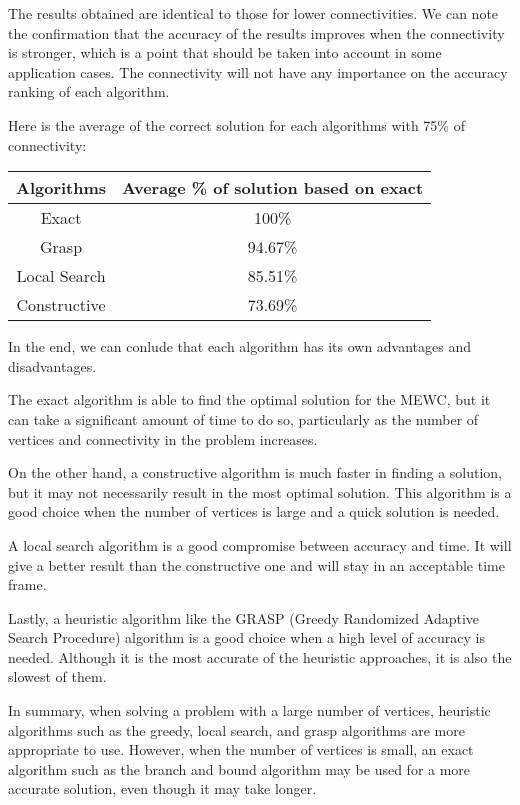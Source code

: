The results obtained are identical to those for lower connectivities. We can note the confirmation that the accuracy of the results improves when the connectivity is stronger, which is a point that should be taken into account in some application cases. The connectivity will not have any importance on the accuracy ranking of each algorithm. \bigskip

Here is the average of the correct solution for each algorithms with 75\% of connectivity: \bigskip

\begin{center}
    \begin{tabular}{|c|c|}
        \hline
        \textbf{Algorithms} & \textbf{Average \% of solution based on exact}                         \\
        \hline
        Exact & 100\% \\
        Grasp & 94.67\% \\
        Local Search & 85.51\% \\
        Constructive & 73.69\% \\
        \hline
    \end{tabular}
\end{center}

In the end, we can conlude that each algorithm has its own advantages and disadvantages. \bigskip

The exact algorithm is able to find the optimal solution for the MEWC, but it can take a significant amount of time to do so, particularly as the number of vertices and connectivity in the problem increases. \bigskip

On the other hand, a constructive algorithm is much faster in finding a solution, but it may not necessarily result in the most optimal solution. This algorithm is a good choice when the number of vertices is large and a quick solution is needed. \bigskip

A local search algorithm is a good compromise between accuracy and time. It will give a better result than the constructive one and will stay in an acceptable time frame. \bigskip

Lastly, a heuristic algorithm like the GRASP (Greedy Randomized Adaptive Search Procedure) algorithm is a good choice when a high level of accuracy is needed. Although it is the most accurate of the heuristic approaches, it is also the slowest of them. \bigskip

In summary, when solving a problem with a large number of vertices, heuristic algorithms such as the greedy, local search, and grasp algorithms are more appropriate to use. However, when the number of vertices is small, an exact algorithm such as the branch and bound algorithm may be used for a more accurate solution, even though it may take longer. \bigskip